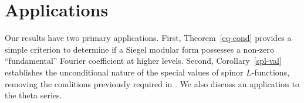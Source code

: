 \documentclass[11pt]{amsart}
\numberwithin{equation}{section}
\newcommand{\mbb}{\mathbb}
\newcommand{\mrm}{\mathrm} %
\begin{document}
    
    


\section{Applications} \label{applns}
Our results have two primary applications. First, Theorem~\ref{eq-cond} provides a simple criterion to determine if a Siegel modular form possesses a non-zero ``fundamental'' Fourier coefficient at higher levels. Second, Corollary~\ref{spl-val} establishes the unconditional nature of the special values of spinor $L$-functions, removing the conditions previously required in \cite{eischen2024algebraicity}. We also discuss an application to the theta series.
\end{document}
